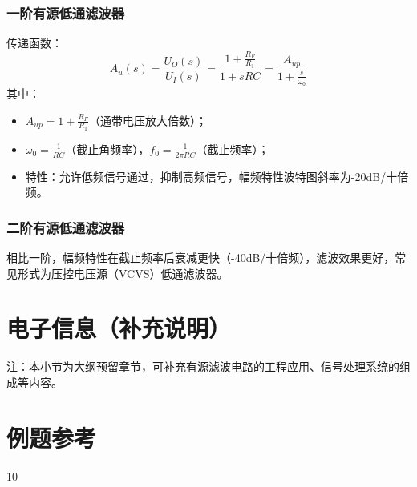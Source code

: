\subsubsection{一阶有源低通滤波器}
传递函数：
\[ A_u(s) = \frac{U_O(s)}{U_I(s)} = \frac{1 + \frac{R_F}{R_1}}{1 + sRC} = \frac{A_{up}}{1 + \frac{s}{\omega_0}} \]
其中：
\begin{itemize}
    \item $A_{up} = 1 + \frac{R_F}{R_1}$（通带电压放大倍数）；
    \item $\omega_0 = \frac{1}{RC}$（截止角频率），$f_0 = \frac{1}{2\pi RC}$（截止频率）；
    \item 特性：允许低频信号通过，抑制高频信号，幅频特性波特图斜率为-20dB/十倍频。
\end{itemize}

\subsubsection{二阶有源低通滤波器}
相比一阶，幅频特性在截止频率后衰减更快（-40dB/十倍频），滤波效果更好，常见形式为压控电压源（VCVS）低通滤波器。

\section{电子信息（补充说明）}
注：本小节为大纲预留章节，可补充有源滤波电路的工程应用、信号处理系统的组成等内容。

\section{例题参考}
10